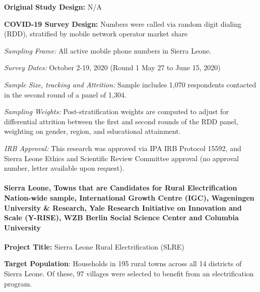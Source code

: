\documentclass[
  12pt,
]{article}
\begin{document}
\textbf{Original Study Design:} N/A

\textbf{COVID-19 Survey Design:} Numbers were called via random digit dialing (RDD), stratified by mobile network operator market share

\emph{Sampling Frame:} All active mobile phone numbers in Sierra Leone.

\emph{Survey Dates:} October 2-19, 2020 (Round 1 May 27 to June 15, 2020)

\emph{Sample Size, tracking and Attrition:} Sample includes 1,070 respondents contacted in the second round of a panel of 1,304.

\emph{Sampling Weights:} Post-stratification weights are computed to adjust for differential attrition between the first and second rounds of the RDD panel, weighting on gender, region, and educational attainment.

\emph{IRB Approval:} This research was approved via IPA IRB Protocol 15592, and Sierra Leone Ethics and Scientific Review Committee approval (no approval number, letter available upon request).

\hypertarget{sierra-leone-towns-that-are-candidates-for-rural-electrification-nation-wide-sample-international-growth-centre-igc-wageningen-university-research-yale-research-initiative-on-innovation-and-scale-y-rise-wzb-berlin-social-science-center-and-columbia-university}{%
\paragraph*{Sierra Leone, Towns that are Candidates for Rural Electrification Nation-wide sample, International Growth Centre (IGC), Wageningen University \& Research, Yale Research Initiative on Innovation and Scale (Y-RISE), WZB Berlin Social Science Center and Columbia University}\label{sierra-leone-towns-that-are-candidates-for-rural-electrification-nation-wide-sample-international-growth-centre-igc-wageningen-university-research-yale-research-initiative-on-innovation-and-scale-y-rise-wzb-berlin-social-science-center-and-columbia-university}}

\textbf{Project Title:} Sierra Leone Rural Electrification (SLRE)

\textbf{Target Population}: Households in 195 rural towns across all 14 districts of Sierra Leone. Of these, 97 villages were selected to benefit from an electrification program.
\end{document}
